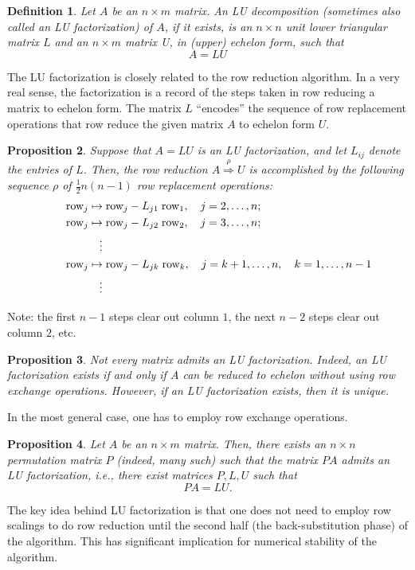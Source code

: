 \documentclass{article}
\newtheorem{proposition}{Proposition}
\newtheorem{definition}[proposition]{Definition}
\newcommand{\row}{\mathrm{row}}
\begin{document}
\begin{definition}
  Let $A$ be an $n\times m$ matrix.  An LU decomposition (sometimes also called an LU factorization) of $A$, if it
  exists, is an $n\times n$ unit lower triangular matrix $L$ and an
  $n\times m$ matrix U, in (upper) echelon form, such that
  \[ A = LU \]
\end{definition}
The LU factorization is closely related to the row reduction
algorithm.  In a very real sense, the factorization is a record of the
steps taken in row reducing a matrix to echelon form.  The  matrix
$L$ ``encodes'' the sequence of row replacement operations that row
reduce the given matrix $A$ to echelon form $U$.
\begin{proposition}
  Suppose that $A=LU$ is an LU factorization, and let $L_{ij}$ denote
  the entries of $L$.  Then, the row reduction
  $A\stackrel{\rho}{\Longrightarrow} U$ is accomplished by the
  following sequence $\rho$ of $\tfrac{1}{2}n(n-1)$ row replacement
  operations:
  \begin{align*}
    \hskip 2em & \row_j \mapsto  \row_j-L_{j1}\; \row_1,\quad
    j=2,\ldots, n;\\ 
     & \row_j \mapsto  \row_j-L_{j2}\; \row_2,\quad j=3,\ldots, n;\\
    & \hskip  3em \vdots \\
    & \row_j \mapsto  \row_j-L_{jk}\; \row_k,\quad j=k+1,\ldots,
    n,\quad k=1,\ldots,n-1 \\  
    & \hskip 3em \vdots 
  \end{align*}
\end{proposition}
Note: the first $n-1$ steps clear out column $1$, the next $n-2$ steps
clear out column $2$, etc.
\begin{proposition}
  Not every matrix admits an LU factorization.  Indeed, an LU
  factorization exists if and only if $A$ can be reduced to echelon
  without using row exchange operations.  However, if an LU
  factorization exists, then it is unique.
\end{proposition}


In the most general case, one has to employ row exchange operations.
\begin{proposition}
  Let $A$ be an $n\times m$ matrix.  Then, there exists an $n\times n$
  permutation matrix $P$ (indeed, many such) such that the matrix $PA$
  admits an LU factorization, i.e., there exist matrices $P, L, U$
  such that
  \[ PA=LU. \]
\end{proposition}
The key idea behind LU factorization is that one does not need to
employ row scalings to do row reduction until the second half (the
back-substitution phase) of the algorithm.  This has significant
implication for numerical stability of the algorithm.
\end{document}
